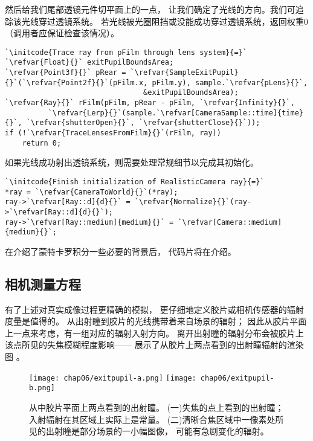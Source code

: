 然后给我们尾部透镜元件切平面上的一点，
让我们确定了光线的方向。我们可追踪该光线穿过透镜系统。
若光线被光圈阻挡或没能成功穿过透镜系统，返回权重0
（调用者应保证检查该情况）。
\begin{lstlisting}
`\initcode{Trace ray from pFilm through lens system}{=}`
`\refvar{Float}{}` exitPupilBoundsArea;
`\refvar{Point3f}{}` pRear = `\refvar{SampleExitPupil}{}`(`\refvar{Point2f}{}`(pFilm.x, pFilm.y), sample.`\refvar{pLens}{}`,
                                &exitPupilBoundsArea);
`\refvar{Ray}{}` rFilm(pFilm, pRear - pFilm, `\refvar{Infinity}{}`,
          `\refvar{Lerp}{}`(sample.`\refvar[CameraSample::time]{time}{}`, `\refvar{shutterOpen}{}`, `\refvar{shutterClose}{}`));
if (!`\refvar{TraceLensesFromFilm}{}`(rFilm, ray))
    return 0;
\end{lstlisting}

如果光线成功射出透镜系统，则需要处理常规细节以完成其初始化。
\begin{lstlisting}
`\initcode{Finish initialization of RealisticCamera ray}{=}`
*ray = `\refvar{CameraToWorld}{}`(*ray);
ray->`\refvar[Ray::d]{d}{}` = `\refvar{Normalize}{}`(ray->`\refvar[Ray::d]{d}{}`);
ray->`\refvar[Ray::medium]{medium}{}` = `\refvar[Camera::medium]{medium}{}`;
\end{lstlisting}

在介绍了蒙特卡罗积分一些必要的背景后，
代码片将在介绍。

\subsection{相机测量方程}\label{sub:相机测量方程}
有了上述对真实成像过程更精确的模拟，
更仔细地定义胶片或相机传感器的辐射度量是值得的。
从出射瞳到胶片的光线携带着来自场景的辐射；
因此从胶片平面上一点来考虑，有一组对应的辐射入射方向。
离开出射瞳的辐射分布会被胶片上该点所见的失焦模糊程度影响——
展示了从胶片上两点看到的出射瞳辐射的渲染图
。
\begin{figure}[htbp]
    \centering
    \texttt{[image: chap06/exitpupil-a.png]}\quad
    \texttt{[image: chap06/exitpupil-b.png]}
    \caption{从中胶片平面上两点看到的出射瞳。
        (一)失焦的点上看到的出射瞳；入射辐射在其区域上实际上是常量。
        (二)清晰合焦区域中一像素处所见的出射瞳是部分场景的一小幅图像，
        可能有急剧变化的辐射。}
    \label{fig:6.24}
\end{figure}

